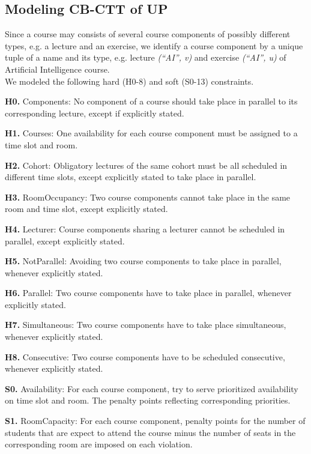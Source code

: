 \documentclass{easychair}
\newcommand{\CBCTT}{CB-CTT}
\newcommand{\UP}{UP}
\begin{document}
\subsection{Modeling \CBCTT{} of \UP{}}
\label{subsec:modeling}
  Since a course may consists of several course components of possibly different types, e.g. a lecture and an exercise, we identify a course component by a unique tuple of a name and its type, e.g. lecture \textit{(``AI'', v)} and exercise \textit{(``AI'', u)} of Artificial Intelligence course. \\
  We modeled the following hard (H0-8) and soft (S0-13) constraints. 

  \textbf{H0.} Components: No component of a course should take place in parallel to its corresponding lecture, except if explicitly stated. 

  \textbf{H1.} Courses: One availability for each course component must be assigned to a time slot and room. 

  \textbf{H2.} Cohort: Obligatory lectures of the same cohort must be all scheduled in different time slots, except explicitly stated to take place in parallel. 

  \textbf{H3.} RoomOccupancy: Two course components cannot take place in the same room and time slot, except explicitly stated. 

  \textbf{H4.} Lecturer: Course components sharing a lecturer cannot be scheduled in parallel, except explicitly stated. 

  \textbf{H5.} NotParallel: Avoiding two course components to take place in parallel, whenever explicitly stated.

  \textbf{H6.} Parallel: Two course components have to take place in parallel, whenever explicitly stated.

  \textbf{H7.} Simultaneous: Two course components have to take place simultaneous, whenever explicitly stated.

  \textbf{H8.} Consecutive: Two course components have to be scheduled consecutive, whenever explicitly stated.

  \textbf{S0.} Availability: For each course component, try to serve prioritized availability on time slot and room. The penalty points reflecting corresponding priorities.  

  \textbf{S1.} RoomCapacity: For each course component, penalty points for the number of students that are expect to attend the course minus the number of seats in the corresponding room are imposed on each violation. 
\end{document}
